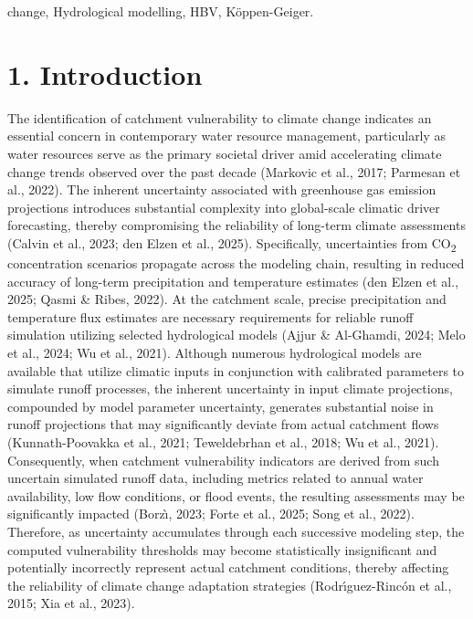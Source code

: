 \documentclass[
]{article}
\begin{document}
change, Hydrological modelling, HBV, Köppen-Geiger.

\section{1. Introduction}\label{introduction}

The identification of catchment vulnerability to climate change
indicates an essential concern in contemporary water resource
management, particularly as water resources serve as the primary
societal driver amid accelerating climate change trends observed over
the past decade (Markovic et al., 2017; Parmesan et al., 2022). The
inherent uncertainty associated with greenhouse gas emission projections
introduces substantial complexity into global-scale climatic driver
forecasting, thereby compromising the reliability of long-term climate
assessments (Calvin et al., 2023; den Elzen et al., 2025). Specifically,
uncertainties from CO\textsubscript{2} concentration scenarios propagate
across the modeling chain, resulting in reduced accuracy of long-term
precipitation and temperature estimates (den Elzen et al., 2025; Qasmi
\& Ribes, 2022). At the catchment scale, precise precipitation and
temperature flux estimates are necessary requirements for reliable
runoff simulation utilizing selected hydrological models (Ajjur \&
Al-Ghamdi, 2024; Melo et al., 2024; Wu et al., 2021). Although numerous
hydrological models are available that utilize climatic inputs in
conjunction with calibrated parameters to simulate runoff processes, the
inherent uncertainty in input climate projections, compounded by model
parameter uncertainty, generates substantial noise in runoff projections
that may significantly deviate from actual catchment flows
(Kunnath-Poovakka et al., 2021; Teweldebrhan et al., 2018; Wu et al.,
2021). Consequently, when catchment vulnerability indicators are derived
from such uncertain simulated runoff data, including metrics related to
annual water availability, low flow conditions, or flood events, the
resulting assessments may be significantly impacted (Borzı̀, 2023; Forte
et al., 2025; Song et al., 2022). Therefore, as uncertainty accumulates
through each successive modeling step, the computed vulnerability
thresholds may become statistically insignificant and potentially
incorrectly represent actual catchment conditions, thereby affecting the
reliability of climate change adaptation strategies (Rodrı́guez-Rincón et
al., 2015; Xia et al., 2023).
\end{document}
